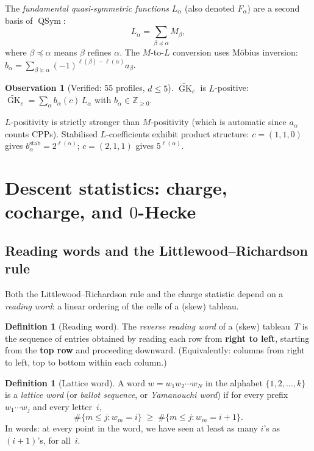 \documentclass[11pt]{article}
\theoremstyle{plain}
\theoremstyle{definition}
\newtheorem{definition}[theorem]{Definition}
\newtheorem{observation}[theorem]{Observation}
\theoremstyle{remark}
\newcommand{\Z}{\mathbb{Z}}
\newcommand{\GK}{\operatorname{GK}}
\newcommand{\QSym}{\operatorname{QSym}}
\begin{document}
The \emph{fundamental quasi-symmetric functions} $L_\alpha$
(also denoted $F_\alpha$) are a second basis of $\QSym$:
\[
  L_\alpha = \sum_{\beta \preceq \alpha} M_\beta,
\]
where $\beta \preceq \alpha$ means $\beta$ refines $\alpha$.
The $M$-to-$L$ conversion uses M\"obius inversion:
$b_\alpha = \sum_{\beta \succeq \alpha}
(-1)^{\ell(\beta)-\ell(\alpha)} a_\beta$.

\begin{observation}[Verified: 55 profiles, $d \leq 5$]
\label{obs:L-pos}
$\widetilde{\GK}_c$ is $L$-positive:
$\widetilde{\GK}_c = \sum_\alpha b_\alpha(c)\, L_\alpha$
with $b_\alpha \in \Z_{\geq 0}$.
\end{observation}

$L$-positivity is strictly stronger than $M$-positivity
(which is automatic since $a_\alpha$ counts CPPs).
Stabilised $L$-coefficients exhibit product structure:
$c = (1,1,0)$ gives $b_\alpha^{\mathrm{stab}} = 2^{\ell(\alpha)}$;
$c = (2,1,1)$ gives $5^{\ell(\alpha)}$.


\section{Descent statistics: charge, cocharge, and $0$-Hecke}
\label{sec:descent}

\subsection{Reading words and the Littlewood--Richardson rule}
\label{sec:reading-word}

Both the Littlewood--Richardson rule and the charge statistic
depend on a \emph{reading word}: a linear ordering of the cells
of a (skew) tableau.

\begin{definition}[Reading word]\label{def:reading-word}
The \emph{reverse reading word} of a (skew) tableau~$T$ is the
sequence of entries obtained by reading each row from
\textbf{right to left}, starting from the \textbf{top row} and
proceeding downward.  (Equivalently: columns from right to left,
top to bottom within each column.)
\end{definition}

\begin{definition}[Lattice word]\label{def:lattice-word}
A word $w = w_1 w_2 \cdots w_N$ in the alphabet
$\{1, 2, \ldots, k\}$ is a \emph{lattice word}
(or \emph{ballot sequence}, or \emph{Yamanouchi word})
if for every prefix $w_1 \cdots w_j$ and every letter~$i$,
\[
  \#\{m \leq j : w_m = i\} \;\geq\; \#\{m \leq j : w_m = i{+}1\}.
\]
In words: at every point in the word, we have seen at least as
many $i$'s as $(i{+}1)$'s, for all~$i$.
\end{definition}
\end{document}
